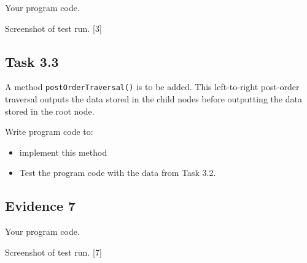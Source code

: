 Your program code.

Screenshot of test run. \hfill{}{[}3{]}

\subsection*{Task 3.3 }

A method \texttt{postOrderTraversal()} is to be added. This left-to-right
post-order traversal outputs the data stored in the child nodes before
outputting the data stored in the root node. 

Write program code to:
\begin{itemize}
\item implement this method
\item Test the program code with the data from Task 3.2.
\end{itemize}

\subsection*{Evidence 7 }

Your program code. 

Screenshot of test run.\hfill{} {[}7{]}
